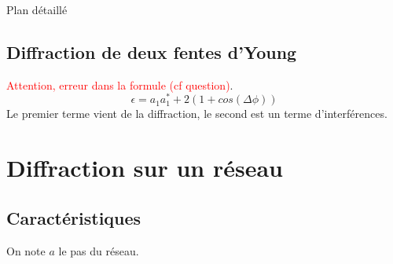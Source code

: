 \begin{reportBlock}{Plan détaillé}
  \subsection{Diffraction de deux fentes d'Young}
  \textcolor{red}{Attention, erreur dans la formule (cf question)}.
  \begin{equation}
      \epsilon = a_1 a_1^* + 2(1+cos(\Delta\phi))
  \end{equation}
  Le premier terme vient de la diffraction, le second est un terme d'interférences.

  \section{Diffraction sur un réseau}
  \subsection{Caractéristiques}
  On note $a$ le pas du réseau.

\end{reportBlock}
